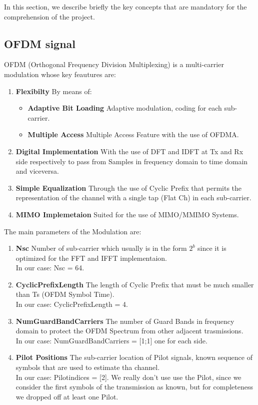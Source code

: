 In this section, we describe briefly the key concepts that 
are mandatory for the comprehension of the project.

\subsection{OFDM signal}

OFDM (Orthogonal Frequency Division Multiplexing)
is a multi-carrier modulation whose key feautures are:
\begin{enumerate}
    \item \textbf{Flexibilty} By means of:
    \begin{itemize}
        \item   \textbf{Adaptive Bit Loading} Adaptive modulation, coding for each sub-carrier.
        \item   \textbf{Multiple Access} Multiple Access Feature with the use of OFDMA.
    \end{itemize}
    \item \textbf{Digital Implementation} With the use of DFT and IDFT at Tx and Rx side respectively to pass from Samples in frequency domain to time domain and viceversa.
    \item \textbf{Simple Equalization} Through the use of Cyclic Prefix that permits the representation of the channel with a single tap (Flat Ch) in each sub-carrier.
    \item \textbf{MIMO Implemetaion} Suited for the use of MIMO/MMIMO Systems.
\end{enumerate}

The main parameters of the Modulation are:
\begin{enumerate}
    \item \textbf{Nsc} Number of sub-carrier which usually is in the form $2^{b}$ since it is optimized for the FFT and IFFT implementaion.\\
                        In our case: Nsc = 64.
    \item \textbf{CyclicPrefixLength} The length of Cyclic Prefix that must be much smaller than Ts (OFDM Symbol Time).\\
                        In our case: CyclicPrefixLength = 4.
    \item \textbf{NumGuardBandCarriers} The number of Guard Bands in frequency domain to protect the OFDM Spectrum from other adjacent trasmissions.\\
                        In our case: NumGuardBandCarriers = [1;1] one for each side.
    \item \textbf{Pilot Positions} The sub-carrier location of Pilot signals, known sequence of symbols that are used to estimate tha channel.\\
                        In our case: Pilotindices = [2]. We really don't use use the Pilot, since we consider the first symbols of the transmission as known, but for completeness we dropped off at least one Pilot.
\end{enumerate}



